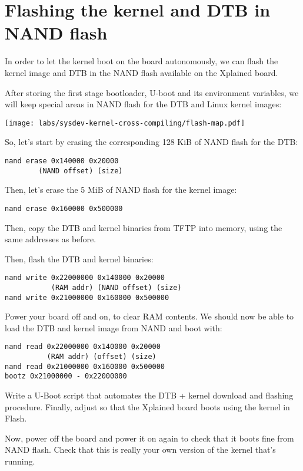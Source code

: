 \section{Flashing the kernel and DTB in NAND flash}

In order to let the kernel boot on the board autonomously, we can
flash the kernel image and DTB in the NAND flash available on the
Xplained board.

After storing the first stage bootloader, U-boot and its environment
variables, we will keep special areas in NAND flash for the DTB
and Linux kernel images:

\begin{center}
  \texttt{[image: labs/sysdev-kernel-cross-compiling/flash-map.pdf]}
\end{center}

So, let's start by erasing the corresponding 128 KiB of NAND flash
for the DTB:

\begin{verbatim}
nand erase 0x140000 0x20000
        (NAND offset) (size)
\end{verbatim}

Then, let's erase the 5 MiB of NAND flash for the kernel image:

\begin{verbatim}
nand erase 0x160000 0x500000
\end{verbatim}

Then, copy the DTB and kernel binaries from TFTP into memory, using the
same addresses as before.

Then, flash the DTB and kernel binaries:

\begin{verbatim}
nand write 0x22000000 0x140000 0x20000
           (RAM addr) (NAND offset) (size)
nand write 0x21000000 0x160000 0x500000
\end{verbatim}

Power your board off and on, to clear RAM contents. We should now be
able to load the DTB and kernel image from NAND and boot with:

\begin{verbatim}
nand read 0x22000000 0x140000 0x20000
          (RAM addr) (offset) (size)
nand read 0x21000000 0x160000 0x500000
bootz 0x21000000 - 0x22000000
\end{verbatim}

Write a U-Boot script that automates the DTB + kernel download
and flashing procedure. Finally, adjust  so that
the Xplained board boots using the kernel in Flash.

Now, power off the board and power it on again to check that it boots
fine from NAND flash. Check that this is really your own version of
the kernel that's running.
